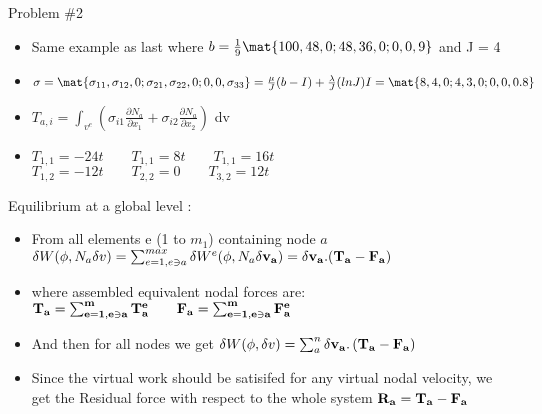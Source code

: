 	\begin{frame}{Problem \#2}
		\begin{itemize}
			\item Same example as last where $b = \frac{1}{9} \mat{100,48,0;48,36,0;0,0,9}$ and J = 4
			\item $\sigma =  \mat{\sigma_{11},\sigma_{12},0;\sigma_{21},\sigma_{22},0;
			0,0,\sigma_{33}} = \frac{\mu}{J}(b-I) + \frac{\lambda}{J}(lnJ)I = \mat{8,4,0;4,3,0;0,0,0.8}$
			\item $T_{a,i} = \int_{v^e} \left(\sigma_{i1} \frac{\partial N_a}{\partial x_1} + \sigma_{i2} \frac{\partial N_a}{\partial x_2} \right)$ dv \\
			\item $ T_{1,1} = -24t \qquad T_{1,1} = 8t \qquad T_{1,1} = 16t $ \\ 
				  $	T_{1,2} = -12t \qquad T_{2,2} = 0 \qquad T_{3,2} = 12t $	 		
		\end{itemize}
 	\end{frame}
 
 
 	\begin{frame}
 		Equilibrium at a global level :
 		\begin{itemize}
 			\item From all elements e (1 to $m_1$) containing node $a$ \\
 			$\delta W(\phi,N_a \delta v) = \sum_{e=1,e \ni a}^{max} \delta W^e(\phi,N_a \delta \mathbf{v_a}) = \delta \mathbf{v_a . (T_a-F_a)}$ 	
 			\item where assembled equivalent nodal forces are:		
 			$\mathbf{T_a =\sum_{e=1,e \ni a}^{m} T_a^e \qquad F_a =\sum_{e=1,e \ni a}^{m} F_a^e  }$
 			\item And then for all nodes we get
 			$\delta W(\phi,\delta v) = \sum_{a}^{n} \mathbf{\delta v_a . \left(T_a -F_a \right)}$
 			\item Since the virtual work should be satisifed for any virtual nodal velocity, we get the Residual force with respect to the whole system
 			$\mathbf{R_a = T_a - F_a}$
 		\end{itemize}
 	\end{frame}
 

